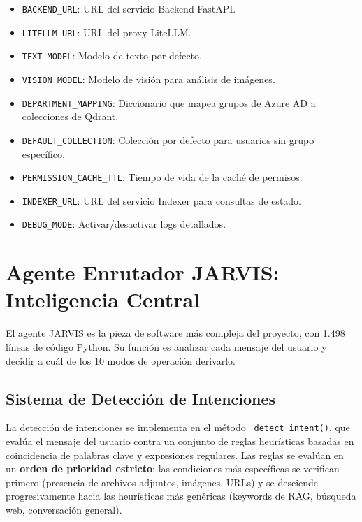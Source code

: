 \begin{itemize}
    \item \texttt{BACKEND\_URL}: URL del servicio Backend FastAPI.
    \item \texttt{LITELLM\_URL}: URL del proxy LiteLLM.
    \item \texttt{TEXT\_MODEL}: Modelo de texto por defecto.
    \item \texttt{VISION\_MODEL}: Modelo de visión para análisis de imágenes.
    \item \texttt{DEPARTMENT\_MAPPING}: Diccionario que mapea grupos de Azure AD a colecciones de Qdrant.
    \item \texttt{DEFAULT\_COLLECTION}: Colección por defecto para usuarios sin grupo específico.
    \item \texttt{PERMISSION\_CACHE\_TTL}: Tiempo de vida de la caché de permisos.
    \item \texttt{INDEXER\_URL}: URL del servicio Indexer para consultas de estado.
    \item \texttt{DEBUG\_MODE}: Activar/desactivar logs detallados.
\end{itemize}

\section{Agente Enrutador JARVIS: Inteligencia Central}
\label{sec:jarvis-detalle}

El agente JARVIS es la pieza de software más compleja del proyecto, con 1.498 líneas de código Python. Su función es analizar cada mensaje del usuario y decidir a cuál de los 10 modos de operación derivarlo.

\subsection{Sistema de Detección de Intenciones}

La detección de intenciones se implementa en el método \texttt{\_detect\_intent()}, que evalúa el mensaje del usuario contra un conjunto de reglas heurísticas basadas en coincidencia de palabras clave y expresiones regulares. Las reglas se evalúan en un \textbf{orden de prioridad estricto}: las condiciones más específicas se verifican primero (presencia de archivos adjuntos, imágenes, URLs) y se desciende progresivamente hacia las heurísticas más genéricas (keywords de RAG, búsqueda web, conversación general).

